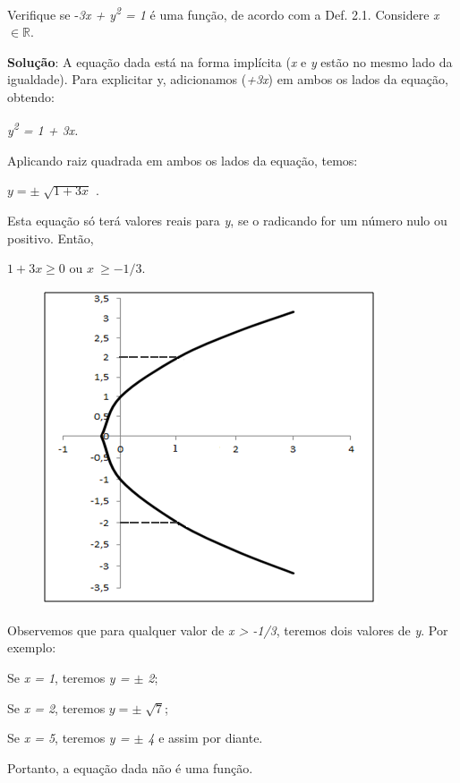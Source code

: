 \begin{texemplo}
Verifique se  -\textit{3x + y\textsuperscript{2} = 1} é uma função, de acordo com a Def. 2.1. Considere \textit{x $ \in \mathbb{R} $}.

\textbf{Solução}: A equação dada está na forma implícita (\textit{x} e \textit{y} estão no mesmo lado da igualdade). Para explicitar y, adicionamos (\textit{+3x}) em ambos os lados da equação, obtendo:

\textit{y\textsuperscript{2} = 1 + 3x.}

Aplicando raiz quadrada em ambos os lados da equação, temos:

 \( y= \pm \sqrt[]{1+3x} \)   .

Esta equação só terá valores reais para \textit{y}, se o radicando for um número nulo ou positivo. Então,

 \( 1+ 3x  \geq  0  \)      ou      \( x~  \geq  -1/3. \) 

\begin{figure}[H]
	\begin{Center}
		\includegraphics[width=3.9in,height=3.67in]{capitulos/funcao_do_primeiro_grau/media/image7.png}
	\end{Center}
\end{figure}

Observemos que para qualquer valor de \textit{x > -1/3}, teremos dois valores de \textit{y}. Por exemplo:

\tab Se \textit{x = 1}, teremos \textit{y = $ \pm $  2};  

\tab Se \textit{x = 2}, teremos   \( y= \pm \sqrt[]{7} \);

\tab Se \textit{x = 5}, teremos \textit{y = $ \pm $  4 }e assim por diante.   

Portanto, a equação dada não é uma função.  \qedsymbol{}
\end{texemplo}

